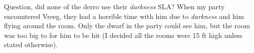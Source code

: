 Question, did none of the derro use their {\itshape darkness} SLA? When my party encountered Vreeg, they had a horrible time with him due to  {\itshape darkness} and him flying around the room. Only the dwarf in the party could see him, but the room was too big to for him to be hit (I decided all the rooms were 15 ft high unless stated otherwise). 
